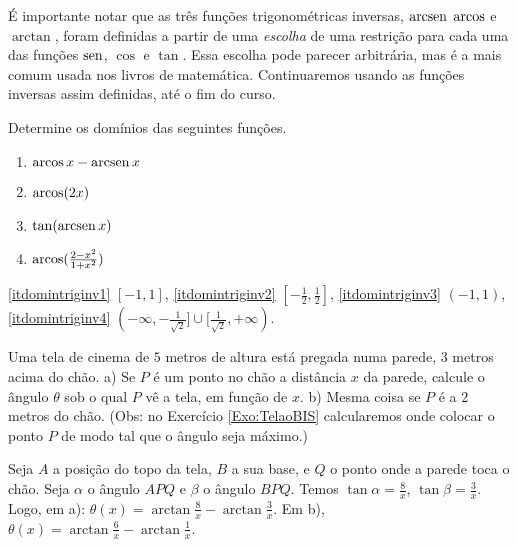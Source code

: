 \begin{obs}
 É importante notar que as três funções trigonométricas inversas, $\operatorname{arcsen}$ $\operatorname{arcos}$ e
$\arctan$, foram definidas a partir de uma \emph{escolha} de uma restrição para cada uma
das funções $\operatorname{sen}$, $\cos$ e $\tan$.
Essa escolha pode parecer arbitrária, mas é a mais comum usada nos livros de matemática.
Continuaremos usando as funções inversas assim definidas, até o fim do curso. 
\end{obs}

\begin{exo}
Determine os domínios das seguintes funções.
\begin{multicols}{2}
\begin{enumerate}
\item\label{itdomintriginv1} $\operatorname{arcos} x -\operatorname{arcsen} x$
\item\label{itdomintriginv2} $\operatorname{arcos} (2x)$
\item\label{itdomintriginv3} $\tan (\operatorname{arcsen} x)$
\item\label{itdomintriginv4} $\operatorname{arcos}(\tfrac{2-x^2}{1+x^2})$
\end{enumerate}
\end{multicols}
\vspace{0.1mm}
\begin{sol}
\eqref{itdomintriginv1} $[-1,1]$,
\eqref{itdomintriginv2} $[-\tfrac12,\tfrac12]$,
\eqref{itdomintriginv3} $(-1,1)$,
\eqref{itdomintriginv4} $(-\infty,-\tfrac{1}{\sqrt{2}}]\cup
[\tfrac{1}{\sqrt{2}},+\infty)$.
\end{sol}
\end{exo}

\begin{exo}\label{Exo:Telao}
Uma tela de cinema de $5$ metros de altura está pregada numa parede, $3$ metros acima do chão.
a) Se $P$ é um ponto no chão a distância $x$ da parede, calcule o ângulo $\theta$ sob o qual 
$P$ vê a tela, em função de $x$. 
b) Mesma coisa se $P$ é a $2$ metros do chão.
(Obs: no Exercício \ref{Exo:TelaoBIS} calcularemos onde colocar o ponto $P$ de modo tal que o ângulo 
seja máximo.)
\begin{sol}
Seja $A$ a posição do topo da tela, $B$ a sua base, e $Q$ o ponto onde a parede toca o chão.
Seja $\alpha$ o ângulo $APQ$ e $\beta$ o ângulo $BPQ$.
Temos $\tan \alpha=\tfrac8x$, $\tan \beta=\tfrac3x$. Logo, em a): 
$\theta(x)=\arctan\tfrac8x-\arctan\tfrac3x$. Em
b), $\theta(x)=\arctan\tfrac6x-\arctan\tfrac1x$. 
\end{sol}
\end{exo}

